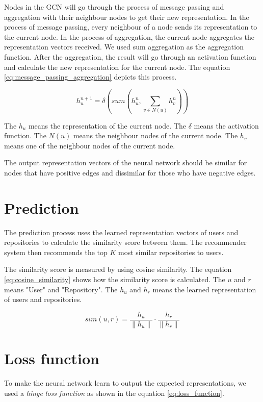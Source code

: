 \documentclass[11pt,twoside]{report}
\begin{document}
Nodes in the GCN will go through the process of message passing and aggregation with their neighbour nodes to get their new representation. In the process of message passing, every neighbour of a node sends its representation to the current node. In the process of aggregation, the current node aggregates the representation vectors received. We used sum aggregation as the aggregation function. After the aggregation, the result will go through an activation function and calculate the new representation for the current node. The equation \ref{eq:message_passing_aggregation} depicts this process.

\begin{equation}
    h_u^{n+1}=\delta(sum(h_u^n, \sum_{v\in{N(u)}}h_v^n))
    \label{eq:message_passing_aggregation}
\end{equation}

The $h_u$ means the representation of the current node. The $\delta$ means the activation function. The $N(u)$ means the neighbour nodes of the current node. The $h_v$ means one of the neighbour nodes of the current node.

The output representation vectors of the neural network should be similar for nodes that have positive edges and dissimilar for those who have negative edges.

\section{Prediction}
The prediction process uses the learned representation vectors of users and repositories to calculate the similarity score between them. The recommender system then recommends the top $K$ most similar repositories to users.

The similarity score is measured by using cosine similarity. The equation \ref{eq:cosine_similarity} shows how the similarity score is calculated. The $u$ and $r$ means "User" and "Repository". The $h_u$ and $h_r$ means the learned representation of users and repositories.

\begin{equation}
    sim(u, r) = \frac{h_u}{\|h_u\|}\cdot\frac{h_r}{\|h_r\|}
    \label{eq:cosine_similarity}
\end{equation}

\section{Loss function}
To make the neural network learn to output the expected representations, we used a \textit{hinge loss function} as shown in the equation \ref{eq:loss_function}.
\end{document}
